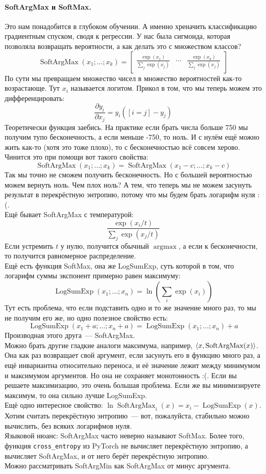 \documentclass{article}
\DeclareMathOperator{\SoftArgMax}{SoftArgMax}
\DeclareMathOperator{\SoftMax}{LogSumExp}
\begin{document}
    \paragraph{SoftArgMax и SoftMax.}
    Это нам понадобится в глубоком обучении. А именно хреначить классификацию градиентным спуском, сводя к регрессии. У нас была сигмоида, которая позволяла возвращать вероятности, а как делать это с множеством классов?
    \[
    \SoftArgMax(x_1;\ldots;x_k)=\left[\begin{matrix}\frac{\exp(x_1)}{\sum_j\exp(x_j)}&\cdots&\frac{\exp(x_k)}{\sum_j\exp(x_j)}\end{matrix}\right]
    \]
    По сути мы превращаем множество чисел в множество вероятностей как-то возрастающе. Тут $x_i$ называется логитом. Прикол в том, что мы теперь можем это дифференцировать:
    \[
    \frac{\partial y_i}{\partial x_j}=y_i([i=j]-y_j)
    \]
    Теоретически функция заебись. На практике если брать числа больше 750 мы получим тупо бесконечность, а если меньше -750, то ноль. И с нулём ещё можно жить как-то (хотя это тоже плохо), то с бесконечностью всё совсем херово.\\
    Чинится это при помощи вот такого свойства:
    \[
    \SoftArgMax(x_1;\ldots;x_k)=\SoftArgMax(x_1-c;\ldots;x_k-c)
    \]
    Так мы точно не сможем получить бесконечность. Но с большей вероятностью можем вернуть ноль. Чем плох ноль? А тем, что теперь мы не можем засунуть результат в перекрёстную энтропию, потому что мы будем брать логарифм нуля :(.\\
    Ещё бывает SoftArgMax с температурой:
    \[
    \frac{\exp(x_i/t)}{\sum_j\exp(x_j/t)}
    \]
    Если устремить $t$ у нулю, получится обычный $\operatorname{argmax}$, а если к бесконечности, то получится равномерное распределение.\\
    Ещё есть функция SoftMax, она же LogSumExp, суть которой в том, что логарифм суммы экспонент примерно равен максимуму:
    \[
    \SoftMax(x_1;\ldots;x_n)=\ln\left(\sum\limits_i\exp(x_i)\right)
    \]
    Тут есть проблема, что если подставить одно и то же значение много раз, то мы не получим его же, но одно полезное свойство есть:
    \[
    \SoftMax(x_1+a;\ldots;x_n+a)=\SoftMax(x_1;\ldots;x_n)+a
    \]
    Производная этого друга~--- SoftArgMax.\\
    Можно брать другие гладкие аналоги максимума, например, $\dotprod{x}{\SoftArgMax(x)}$. Она как раз возвращает свой аргумент, если засунуть его в функцию много раз, а ещё инвариантна относительно переноса, и её значение лежит между минимумом и максимумом аргументов. Но она не сохраняет монотонность :(. Если вы решаете максимизацию, это очень большая проблема. Если же вы минимизируете максимум, то она сильно лучше LogSumExp.\\
    Ещё одно интересное свойство: $\ln\SoftArgMax_i(x)=x_i-\SoftMax(x)$. Хотим считать перекрёстную энтропию~--- вот, пожалуйста, стабильно можно вычислить, без всяких логарифмов нуля.\\
    Языковой нюанс: SoftArgMax часто неверно называют SoftMax. Более того, функция \Verb|cross_entropy| из PyTorch  не вычисляет перекрёстную энтропию, а вычисляет SoftArgMax, и от него берёт перекрёстную энтропию.\\
    Можно рассматривать SoftArgMin как SoftArgMax от минус аргумента.
\end{document}

